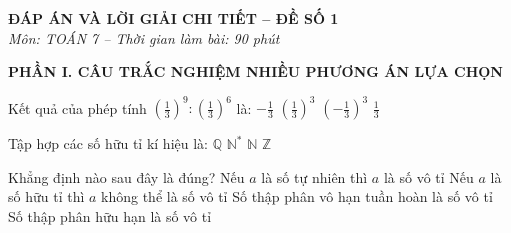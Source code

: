 \documentclass[12pt,a4paper]{article}
\begin{document}
\begin{center}
\textbf{\Large ĐÁP ÁN VÀ LỜI GIẢI CHI TIẾT -- ĐỀ SỐ 1}\\
\textit{Môn: TOÁN 7 -- Thời gian làm bài: 90 phút}
\end{center}
\vspace{2mm}

\noindent\textbf{\large PHẦN I. CÂU TRẮC NGHIỆM NHIỀU PHƯƠNG ÁN LỰA CHỌN}

\vspace{1mm}
\begin{ex}
Kết quả của phép tính $\left(\frac{1}{3}\right)^9 : \left(\frac{1}{3}\right)^6$ là:
\choice
{$-\frac{1}{3}$}
{\True $\left(\frac{1}{3}\right)^3$}
{$\left(-\frac{1}{3}\right)^3$}
{$\frac{1}{3}$}
\end{ex}

\begin{ex}
Tập hợp các số hữu tỉ kí hiệu là:
\choice
{\True $\mathbb{Q}$}
{$\mathbb{N}^*$}
{$\mathbb{N}$}
{$\mathbb{Z}$}
\end{ex}

\begin{ex}
Khẳng định nào sau đây là đúng?
\choice
{Nếu $a$ là số tự nhiên thì $a$ là số vô tỉ}
{\True Nếu $a$ là số hữu tỉ thì $a$ không thể là số vô tỉ}
{Số thập phân vô hạn tuần hoàn là số vô tỉ}
{Số thập phân hữu hạn là số vô tỉ}
\end{ex}
\end{document}
